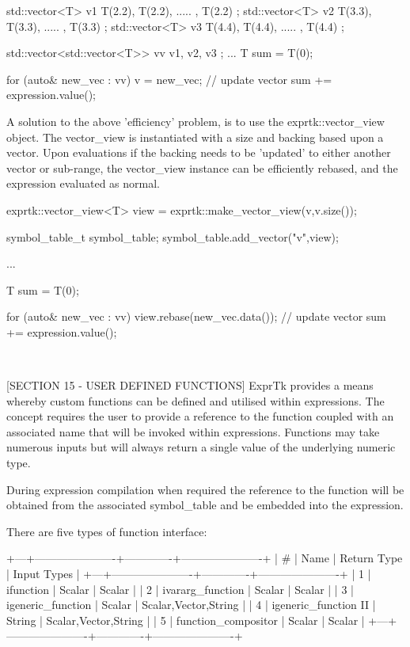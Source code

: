 std::vector<T> v1 { T(2.2), T(2.2), ..... , T(2.2) };
std::vector<T> v2 { T(3.3), T(3.3), ..... , T(3.3) };
std::vector<T> v3 { T(4.4), T(4.4), ..... , T(4.4) };

std::vector<std::vector<T>> vv { v1, v2, v3 };
...
T sum = T(0);

for (auto\& new\_vec : vv)
{
v = new\_vec; // update vector
sum += expression.value();
}


A  solution  to  the  above  'efficiency'  problem,  is  to  use   the
exprtk::vector\_view  object. The  vector\_view is  instantiated with  a
size and backing based upon a vector. Upon evaluations if the  backing
needs  to  be  'updated' to  either another  vector or  sub-range, the
vector\_view instance  can be  efficiently rebased,  and the expression
evaluated as normal.

exprtk::vector\_view<T> view = exprtk::make\_vector\_view(v,v.size());

symbol\_table\_t symbol\_table;
symbol\_table.add\_vector("v",view);

...

T sum = T(0);

for (auto\& new\_vec : vv)
{
view.rebase(new\_vec.data()); // update vector
sum += expression.value();
}

~~~~~~~~~~~~~~~~~~~~~~~~~~~~~~~~~~~~~~~~~~~~~~~~~~~~~~~~~~

[SECTION 15 - USER DEFINED FUNCTIONS]
ExprTk provides a means  whereby custom functions can  be defined  and
utilised within  expressions.  The   concept  requires  the  user   to
provide a reference  to the function  coupled with an  associated name
that  will be invoked within  expressions. Functions may take numerous
inputs but will always return a single value of the underlying numeric
type.

During  expression  compilation  when required  the  reference  to the
function  will be  obtained from  the associated  symbol\_table and  be
embedded into the expression.

There are five types of function interface:

+---+----------------------+-------------+----------------------+
| \# |         Name         | Return Type | Input Types          |
+---+----------------------+-------------+----------------------+
| 1 | ifunction            | Scalar      | Scalar               |
| 2 | ivararg\_function     | Scalar      | Scalar               |
| 3 | igeneric\_function    | Scalar      | Scalar,Vector,String |
| 4 | igeneric\_function II | String      | Scalar,Vector,String |
| 5 | function\_compositor  | Scalar      | Scalar               |
+---+----------------------+-------------+----------------------+

